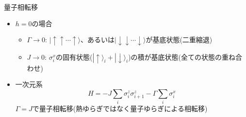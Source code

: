 \begin{frame}[t,fragile]{量子相転移}
  \begin{itemize}
  \item $h=0$の場合
    \begin{itemize}
    \item $\Gamma \rightarrow 0$: $|\!\uparrow\uparrow\cdots\uparrow\rangle$、あるいは$|\!\downarrow\downarrow\cdots\downarrow\rangle$が基底状態(二重縮退)
    \item $J \rightarrow 0$: $\sigma_i^x$の固有状態($|\!\uparrow\rangle_i + |\!\downarrow\rangle_i$)の積が基底状態(全ての状態の重ね合わせ)
    \end{itemize}
  \item 一次元系
    \[
      H = - J \sum_{i} \sigma_i^z \sigma_{i+1}^z - \Gamma \sum_i \sigma_i^x
    \]
    $\Gamma = J$で量子相転移(熱ゆらぎではなく量子ゆらぎによる相転移)  
  \end{itemize}
\end{frame}
